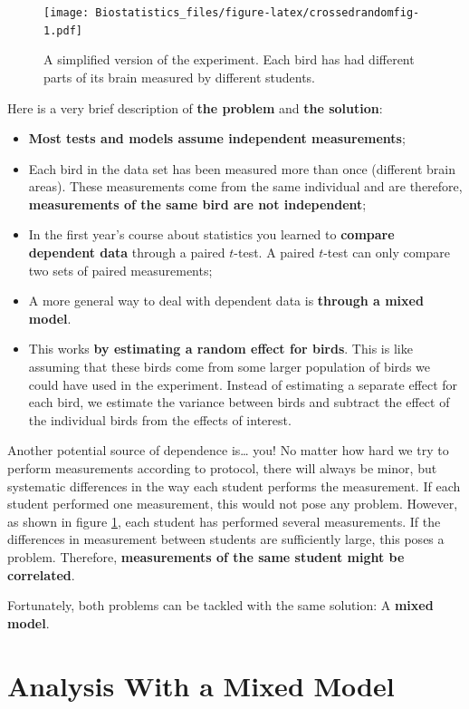 \documentclass[
]{book}
\providecommand{\tightlist}{%
  \setlength{\itemsep}{0pt}\setlength{\parskip}{0pt}}
\begin{document}
\begin{figure}
\centering
\texttt{[image: Biostatistics\_files/figure-latex/crossedrandomfig-1.pdf]}
\caption{\label{fig:crossedrandomfig}\label{fig:crossedrandom}A simplified version of the experiment. Each bird has had different parts of its brain measured by different students.}
\end{figure}

Here is a very brief description of \textbf{the problem} and \textbf{the solution}:

\begin{itemize}
\tightlist
\item
  \textbf{Most tests and models assume independent measurements};
\item
  Each bird in the data set has been measured more than once (different brain areas). These measurements come from the same individual and are therefore, \textbf{measurements of the same bird are not independent};
\item
  In the first year's course about statistics you learned to \textbf{compare dependent data} through a paired \(t\)-test. A paired \(t\)-test can only compare two sets of paired measurements;
\item
  A more general way to deal with dependent data is \textbf{through a mixed model}.
\item
  This works \textbf{by estimating a random effect for birds}. This is like assuming that these birds come from some larger population of birds we could have used in the experiment. Instead of estimating a separate effect for each bird, we estimate the variance between birds and subtract the effect of the individual birds from the effects of interest.
\end{itemize}

Another potential source of dependence is\ldots{} you! No matter how hard we try to perform measurements according to protocol, there will always be minor, but systematic differences in the way each student performs the measurement. If each student performed one measurement, this would not pose any problem. However, as shown in figure \ref{fig:crossedrandom}, each student has performed several measurements. If the differences in measurement between students are sufficiently large, this poses a problem. Therefore, \textbf{measurements of the same student might be correlated}.

Fortunately, both problems can be tackled with the same solution: A \textbf{mixed model}.

\hypertarget{analysis-with-a-mixed-model}{%
\section{Analysis With a Mixed Model}\label{analysis-with-a-mixed-model}}
\end{document}
